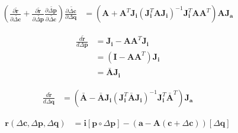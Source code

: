 \begin{equation}
    \begin{aligned}
        \left( \frac{\partial\tilde{\mathbf{r}}}{\partial \tilde{\Delta \mathbf{c}}} + \frac{\partial \tilde{\mathbf{r}}}{\partial \tilde{\Delta \mathbf{p}}} \frac{\partial \tilde{\Delta \mathbf{p}}}{\partial \tilde{\Delta \mathbf{c}}} \right) \frac{\partial \tilde{\Delta \mathbf{c}}}{\partial \Delta \mathbf{q}} & = \left( \mathbf{A} + \mathbf{A}^T \mathbf{J}_{\mathbf{i}} \left( \mathbf{J}_{\mathbf{i}}^T \mathbf{A} \mathbf{J}_{\mathbf{i}} \right)^{-1} \mathbf{J}_{\mathbf{i}}^T \mathbf{A} \mathbf{A}^T \right) \mathbf{A} \mathbf{J}_{\mathbf{a}}
    \label{eq:wiberg_inverse3}
    \end{aligned}
\end{equation}

\begin{equation}
    \begin{aligned}
        \frac{d \tilde{\mathbf{r}}}{d \Delta \mathbf{p}} & = \mathbf{J}_{\mathbf{i}} - \mathbf{A} \mathbf{A}^T \mathbf{J}_{\mathbf{i}}
        \\
        & = (\mathbf{I} - \mathbf{A} \mathbf{A}^T) \mathbf{J}_{\mathbf{i}}
        \\
        & = \bar{\mathbf{A}} \mathbf{J}_{\mathbf{i}}
    \label{eq:wiberg_forward}
    \end{aligned}
\end{equation}

\begin{equation}
    \begin{aligned}
        \frac{d \tilde{\mathbf{r}}}{d \Delta \mathbf{q}} & = \left( \bar{\mathbf{A}} - \bar{\mathbf{A}}\mathbf{J}_{\mathbf{i}} \left(\mathbf{J}_{\mathbf{i}}^T\bar{\mathbf{A}}\mathbf{J}_{\mathbf{i}}\right)^{-1} \mathbf{J}_{\mathbf{i}}^T \bar{\mathbf{A}}^T \right) \mathbf{J}_{\mathbf{a}}
    \label{eq:wiberg_appearance}
    \end{aligned}
\end{equation}









\begin{equation}
    \begin{aligned}
        \mathbf{r}(\Delta \mathbf{c}, \Delta \mathbf{p}, \Delta \mathbf{q}) & = \mathbf{i}[\mathbf{p} \circ \Delta \mathbf{p}] - (\mathbf{a} - \mathbf{A}(\mathbf{c} + \Delta \mathbf{c}))[\Delta \mathbf{q}]
    \label{eq:wiberg_appearance}
    \end{aligned}
\end{equation}

